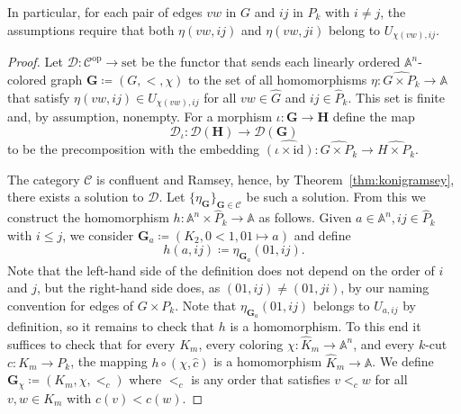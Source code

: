 \documentclass[oneside]{amsart}
\newcommand{\str}[1]{\mathbb{#1}}
\newcommand{\cat}[1]{\mathcal{#1}}
\newcommand{\op}{^{\mathrm{op}}}
\newcommand{\set}{\mathrm{set}}
\begin{document}
In particular, for each pair of edges $vw$ in $G$ and $ij$ in $P_k$ with $i\not=j$, the assumptions require that both $\eta(vw,ij)$ and $\eta(vw, ji)$ belong to $U_{\chi(vw),ij}$.

\begin{proof}
    Let $\cat D\colon \cat C\op\to\set$ be the functor that sends each linearly ordered $\str A^n$-colored graph $\mathbf{G}\coloneq (G,<,\chi)$ to the set of all homomorphisms $\eta\colon \widehat{G\times P_k} \to \str A$ that satisfy $\eta(vw,ij)\in U_{\chi(vw),ij}$ for all $vw \in \hat G$ and $ij\in\hat P_k$. 
    This set is finite and, by assumption, nonempty.
    For a morphism $\iota \colon \mathbf G \to \mathbf H$ define the map
    $$
    \cat D_\iota\colon \cat D(\mathbf{H})\to \cat D(\mathbf{G})
    $$
    to be the precomposition with the embedding $\widehat{(\iota\times \mathrm{id})}\colon \widehat{G\times P_k} \to \widehat{H \times P_k}$.
    \begin{center}
    \end{center}
    The category $\cat C$ is confluent and Ramsey, hence, by Theorem~\ref{thm:konigramsey}, there exists a solution to $\cat D$. Let $\{\eta_{\mathbf{G}}\}_{\mathbf G \in \cat C}$ be such a solution. 
    From this we construct the homomorphism $h\colon \str A^n \times \hat P_k \to \str A$ as follows.
    Given $a\in \str A^n, ij\in \hat P_k$ with $i\leq j$, we consider $\mathbf{G}_{a} \coloneq (K_2, 0<1, 01 \mapsto a)$ and define
    \begin{equation*}
        h(a,ij) \coloneq \eta_{\mathbf{G}_{a}}(01, ij).
    \end{equation*}
    Note that the left-hand side of the definition does not depend on the order of $i$ and $j$, but the right-hand side does, as $(01,ij)\neq (01,ji)$, by our naming convention for edges of $G \times P_k$. 
    Note that $\eta_{\mathbf{G}_{a}}(01, ij)$ belongs to $U_{a,ij}$ by definition, so it remains to check that $h$ is a homomorphism.
    To this end it suffices to check that for every $K_m$, every coloring $\chi\colon \hat K_m\to \str A^n$, and every $k$-cut $c\colon K_m\to P_k$, the mapping $h \circ (\chi,\hat c)$ is a homomorphism $\hat K_m \to \str A$.
    We define $\mathbf{G}_\chi \coloneq (K_m,\chi, <_c)$ where $<_c$ is any order that satisfies $v<_c w$ for all $v,w \in K_m$ with $c(v)<c(w)$.

\end{proof}
\end{document}
